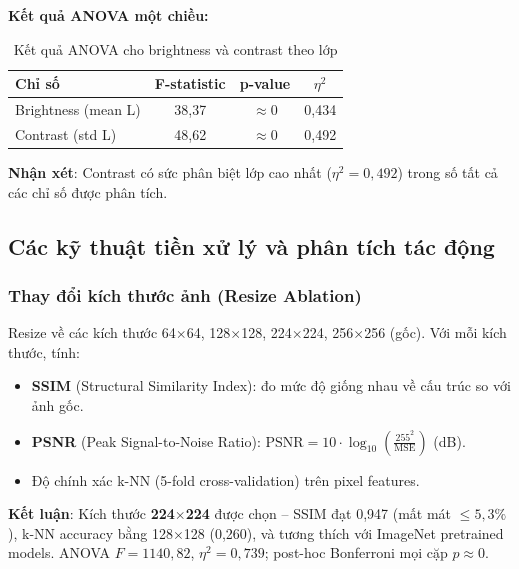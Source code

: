 \documentclass[12pt,a4paper]{article}
\let\oldtextbf\textbf
\renewcommand{\textbf}[1]{\oldtextbf{\textcolor{hcmublue}{#1}}}
\begin{document}
\textbf{Kết quả ANOVA một chiều:}
\begin{table}[H]
\centering
\begin{tabular}{|l|c|c|c|}
\hline
\textbf{Chỉ số} & \textbf{F-statistic} & \textbf{p-value} & \textbf{$\eta^2$} \\ \hline
Brightness (mean L) & 38,37 & $\approx 0$ & 0,434 \\ \hline
Contrast (std L) & 48,62 & $\approx 0$ & 0,492 \\ \hline
\end{tabular}
\caption{Kết quả ANOVA cho brightness và contrast theo lớp}
\label{tab:img_anova_bc}
\end{table}

\textbf{Nhận xét}: Contrast có sức phân biệt lớp cao nhất ($\eta^2 = 0{,}492$) trong số tất cả các chỉ số được phân tích.

\subsection{Các kỹ thuật tiền xử lý và phân tích tác động}

\subsubsection{Thay đổi kích thước ảnh (Resize Ablation)}

Resize về các kích thước 64$\times$64, 128$\times$128, 224$\times$224, 256$\times$256 (gốc). Với mỗi kích thước, tính:
\begin{itemize}
    \item \textbf{SSIM} (Structural Similarity Index): đo mức độ giống nhau về cấu trúc so với ảnh gốc.
    \item \textbf{PSNR} (Peak Signal-to-Noise Ratio): $\text{PSNR} = 10\cdot\log_{10}\!\!\left(\frac{255^2}{\text{MSE}}\right)$ (dB).
    \item Độ chính xác k-NN (5-fold cross-validation) trên pixel features.
\end{itemize}

\textbf{Kết luận}: Kích thước \textbf{224$\times$224} được chọn -- SSIM đạt 0{,}947 (mất mát $\leq 5{,}3\%$), k-NN accuracy bằng 128$\times$128 (0{,}260), và tương thích với ImageNet pretrained models. ANOVA $F=1140{,}82$, $\eta^2=0{,}739$; post-hoc Bonferroni mọi cặp $p \approx 0$.
\end{document}
